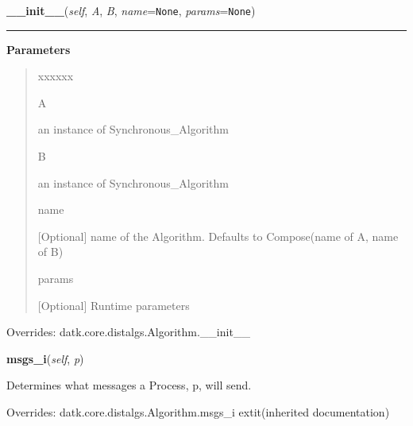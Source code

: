 \hspace{.8\funcindent}\begin{boxedminipage}{\funcwidth}

    \raggedright \textbf{\_\_init\_\_}(\textit{self}, \textit{A}, \textit{B}, \textit{name}={\tt None}, \textit{params}={\tt None})

    \vspace{-1.5ex}

    \rule{\textwidth}{0.5\fboxrule}
\setlength{\parskip}{2ex}
\setlength{\parskip}{1ex}
      \textbf{Parameters}
      \vspace{-1ex}

      \begin{quote}
        \begin{Ventry}{xxxxxx}

          \item[A]

          an instance of Synchronous\_Algorithm

          \item[B]

          an instance of Synchronous\_Algorithm

          \item[name]

          [Optional] name of the Algorithm. Defaults to Compose(name of A, 
          name of B)

          \item[params]

          [Optional] Runtime parameters

        \end{Ventry}

      \end{quote}

      Overrides: datk.core.distalgs.Algorithm.\_\_init\_\_

    \end{boxedminipage}

    \vspace{0.5ex}

\hspace{.8\funcindent}\begin{boxedminipage}{\funcwidth}

    \raggedright \textbf{msgs\_i}(\textit{self}, \textit{p})

\setlength{\parskip}{2ex}
    Determines what messages a Process, p, will send.

\setlength{\parskip}{1ex}
      Overrides: datk.core.distalgs.Algorithm.msgs\_i 	extit{(inherited documentation)}

    \end{boxedminipage}


